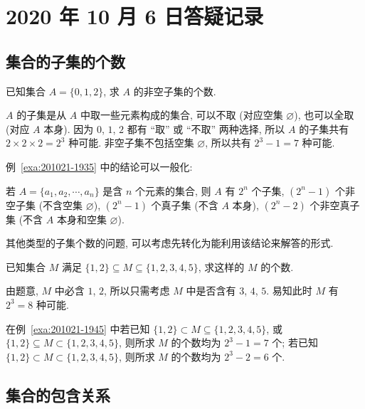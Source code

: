 \section{2020 年 10 月 6 日答疑记录}

\subsection{集合的子集的个数}

\begin{example}\label{exa:201021-1935}
  已知集合 $A=\{0,1,2\}$, 求 $A$ 的非空子集的个数.
\end{example}
\begin{solution}
  $A$ 的子集是从 $A$ 中取一些元素构成的集合, 可以不取 (对应空集 $\varnothing$), 也可以全取 (对应 $A$ 本身). 因为 $0$, $1$, $2$ 都有 ``取'' 或 ``不取'' 两种选择, 所以 $A$ 的子集共有 $2\times 2\times 2= 2^3$ 种可能. 非空子集不包括空集 $\varnothing$, 所以共有 $2^3-1=7$ 种可能.
\end{solution}

例~\ref{exa:201021-1935} 中的结论可以一般化: 

\begin{theorem}
  若 $A=\{a_1,a_2,\cdots,a_n\}$ 是含 $n$ 个元素的集合, 则 $A$ 有 $2^n$ 个子集, $(2^n-1)$ 个非空子集 (不含空集 $\varnothing$), $(2^n-1)$ 个真子集 (不含 $A$ 本身), $(2^n-2)$ 个非空真子集 (不含 $A$ 本身和空集 $\varnothing$).
\end{theorem}

其他类型的子集个数的问题, 可以考虑先转化为能利用该结论来解答的形式.

\begin{example}\label{exa:201021-1945}
  已知集合 $M$ 满足 $\{1,2\}\subseteq M\subseteq \{1,2,3,4,5\}$, 求这样的 $M$ 的个数.
\end{example}
\begin{solution}
  由题意, $M$ 中必含 $1$, $2$, 所以只需考虑 $M$ 中是否含有 $3$, $4$, $5$. 易知此时 $M$ 有 $2^3=8$ 种可能.
\end{solution}

在例~\ref{exa:201021-1945} 中若已知 $\{1,2\}\subset M\subseteq \{1,2,3,4,5\}$, 或 $\{1,2\}\subseteq M\subset \{1,2,3,4,5\}$, 则所求 $M$ 的个数均为 $2^3-1=7$ 个; 若已知 $\{1,2\}\subset M\subset \{1,2,3,4,5\}$, 则所求 $M$ 的个数均为 $2^3-2=6$ 个.

\subsection{集合的包含关系}

